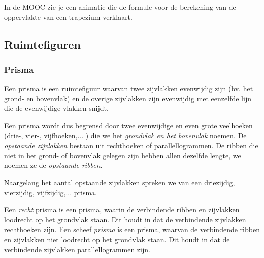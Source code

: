 
In de MOOC zie je een animatie die de formule voor de berekening van de oppervlakte van een trapezium verklaart.


\subsection{Ruimtefiguren}

\subsubsection{Prisma}
\begin{definitie}
	Een prisma is een ruimtefiguur waarvan twee zijvlakken evenwijdig zijn (bv. het grond- en bovenvlak) en de overige zijvlakken zijn evenwijdig met eenzelfde lijn die de evenwijdige vlakken snijdt.
\end{definitie} 
Een prisma wordt dus begrensd door twee evenwijdige en even grote veelhoeken (drie-, vier-, vijfhoeken,... ) die we het \emph{grondvlak en het bovenvlak} noemen. De \emph{opstaande zijvlakken} bestaan uit rechthoeken of parallellogrammen. De ribben die niet in het grond- of bovenvlak gelegen zijn hebben allen dezelfde lengte, we noemen ze de \emph{opstaande ribben}.

Naargelang het aantal opstaande zijvlakken spreken we van een driezijdig, vierzijdig, vijfzijdig,... prisma.

Een \emph{recht} prisma is een prisma, waarin de verbindende ribben en zijvlakken loodrecht op het grondvlak staan. Dit houdt in dat de verbindende zijvlakken rechthoeken zijn. Een scheef \emph{prisma} is een prisma, waarvan de verbindende ribben en zijvlakken niet loodrecht op het grondvlak staan. Dit houdt in dat de verbindende zijvlakken parallellogrammen zijn.

